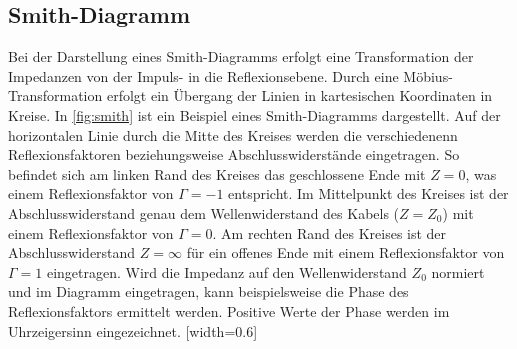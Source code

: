 \subsection{Smith-Diagramm}
Bei der Darstellung eines Smith-Diagramms erfolgt eine Transformation der Impedanzen von der Impuls- in die Reflexionsebene. Durch eine Möbius-Transformation erfolgt ein Übergang der Linien in kartesischen Koordinaten in Kreise. In \autoref{fig:smith} ist ein Beispiel eines Smith-Diagramms dargestellt. Auf der horizontalen Linie durch die Mitte des Kreises werden die verschiedenenn Reflexionsfaktoren beziehungsweise Abschlusswiderstände eingetragen. So befindet sich am linken Rand des Kreises das geschlossene Ende mit $Z=0$, was einem Reflexionsfaktor von $\Gamma=-1$ entspricht. Im Mittelpunkt des Kreises ist der Abschlusswiderstand genau dem Wellenwiderstand des Kabels ($Z=Z_0$) mit einem Reflexionsfaktor von $\Gamma=0$. Am rechten Rand des Kreises ist der Abschlusswiderstand $Z=\infty$  für ein offenes Ende mit einem Reflexionsfaktor von $\Gamma=1$ eingetragen. Wird die Impedanz auf den Wellenwiderstand $Z_0$ normiert und im Diagramm eingetragen, kann beispielsweise die Phase des Reflexionsfaktors ermittelt werden. Positive Werte der Phase werden im Uhrzeigersinn eingezeichnet.
[width=0.6\textwidth]
